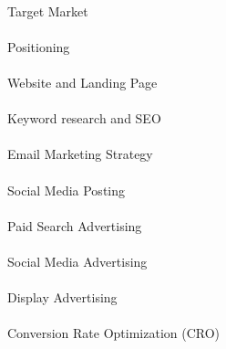\documentclass[
  12pt,
  letterpaper,
  DIV=11,
  numbers=noendperiod]{scrartcl}
\makeatletter
\let\oldparagraph\paragraph
\renewcommand{\paragraph}{
    \@ifstar
      \xxxParagraphStar
      \xxxParagraphNoStar
  }
\newcommand{\xxxParagraphStar}[1]{\oldparagraph*{#1}\mbox{}}
\newcommand{\xxxParagraphNoStar}[1]{\oldparagraph{#1}\mbox{}}
\makeatother
\begin{document}
\paragraph{Target Market}\label{target-market}

\paragraph{Positioning}\label{positioning}

\paragraph{Website and Landing Page}\label{website-and-landing-page-1}

\paragraph{Keyword research and SEO}\label{keyword-research-and-seo-1}

\paragraph{Email Marketing Strategy}\label{email-marketing-strategy}

\paragraph{Social Media Posting}\label{social-media-posting-1}

\paragraph{Paid Search Advertising}\label{paid-search-advertising-1}

\paragraph{Social Media Advertising}\label{social-media-advertising-1}

\paragraph{Display Advertising}\label{display-advertising-1}

\paragraph{Conversion Rate Optimization
(CRO)}\label{conversion-rate-optimization-cro-1}
\end{document}
